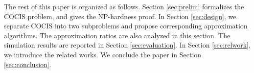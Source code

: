 The rest of this paper is organized as follows. Section \ref{sec:prelim} formalizes the COCIS problem, and gives the NP-hardness proof. In Section \ref{sec:design}, we separate COCIS into two subproblems and propose corresponding approximation algorithms. The approximation ratios are also analyzed in this section. The simulation results are reported in Section \ref{sec:evaluation}. In Section \ref{sec:relwork}, we introduce the related works. We conclude the paper in Section \ref{sec:conclusion}.
